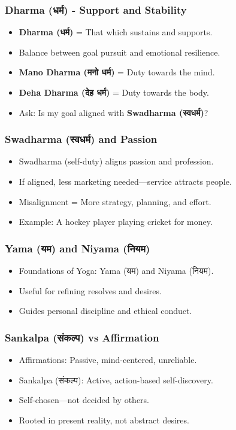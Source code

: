 \begin{frame}[fragile]\frametitle{Dharma (धर्म) - Support and Stability}
      \begin{itemize}
        \item \textbf{Dharma (धर्म)} = That which sustains and supports.
        \item Balance between goal pursuit and emotional resilience.
        \item \textbf{Mano Dharma (मनो धर्म)} = Duty towards the mind.
        \item \textbf{Deha Dharma (देह धर्म)} = Duty towards the body.
        \item Ask: Is my goal aligned with \textbf{Swadharma (स्वधर्म)}?
      \end{itemize}
\end{frame}

\begin{frame}[fragile]\frametitle{Swadharma (स्वधर्म) and Passion}
      \begin{itemize}
        \item Swadharma (self-duty) aligns passion and profession.
        \item If aligned, less marketing needed—service attracts people.
        \item Misalignment = More strategy, planning, and effort.
        \item Example: A hockey player playing cricket for money.
      \end{itemize}
\end{frame}

\begin{frame}[fragile]\frametitle{Yama (यम) and Niyama (नियम)}
      \begin{itemize}
        \item Foundations of Yoga: Yama (यम) and Niyama (नियम).
        \item Useful for refining resolves and desires.
        \item Guides personal discipline and ethical conduct.
      \end{itemize}
\end{frame}

\begin{frame}[fragile]\frametitle{Sankalpa (संकल्प) vs Affirmation}
      \begin{itemize}
        \item Affirmations: Passive, mind-centered, unreliable.
        \item Sankalpa (संकल्प): Active, action-based self-discovery.
        \item Self-chosen—not decided by others.
        \item Rooted in present reality, not abstract desires.
      \end{itemize}
\end{frame}

